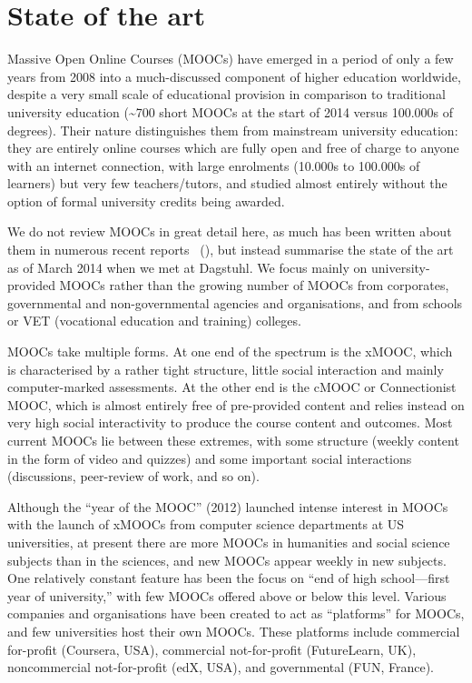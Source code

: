 \section{State of the art}

Massive Open Online Courses (MOOCs) have emerged in a period of only a
few years from 2008 into a much-discussed component of higher education
worldwide, despite a very small scale of educational provision in
comparison to traditional university education (\textasciitilde{}700
short MOOCs at the 
start of 2014 versus 100.000s of degrees).  Their nature distinguishes
them from mainstream university education: they are entirely online
courses which are fully open and free of charge to anyone with an
internet connection, with large enrolments (10.000s to 100.000s of
learners) but very few teachers/tutors, and studied almost entirely
without the option of formal university credits being awarded.

We do not review MOOCs in great detail here, as much has been written
about them in numerous recent reports~\cite{gaebel-moocs-2014} (), but instead summarise the state of
the art as of March 2014 when we met at Dagstuhl.
We focus mainly on university-provided MOOCs rather than
the growing number of MOOCs from corporates, governmental and
non-governmental agencies and organisations, and from schools or VET
(vocational education and training)
colleges.

MOOCs take multiple forms.  At one end of the spectrum is the xMOOC,
which is characterised by a rather tight structure, little social
interaction and mainly computer-marked assessments.  
At the other end
is the cMOOC or Connectionist MOOC, which is almost entirely free of
pre-provided content and relies instead on very high social
interactivity to produce the 
course content and outcomes.  Most current MOOCs lie
between these extremes, with some structure (weekly content in the form
of video and quizzes) and some important social interactions
(discussions, peer-review of work, and so on).

Although the ``year of the MOOC'' (2012) launched intense interest in
MOOCs with the launch of xMOOCs from computer science
departments at US universities, at present there are more MOOCs in
humanities and social 
science subjects than in the sciences, and new MOOCs appear weekly in new
subjects.  One relatively constant feature has been the focus on ``end of
high school---first year of university,'' with few MOOCs offered above or
below this level.  Various companies and organisations have been created
to act as   ``platforms'' for MOOCs, and few universities host their own
MOOCs. These platforms include commercial for-profit (Coursera, USA),
commercial not-for-profit (FutureLearn, UK), noncommercial
not-for-profit (edX, USA), and governmental (FUN, France).

